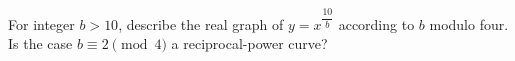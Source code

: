For integer $b>10$, describe the real graph of $y=x^{\dfrac{10}{b}}$ according to $b$ modulo four. Is the case $b\equiv2\pmod4$ a reciprocal-power curve?
